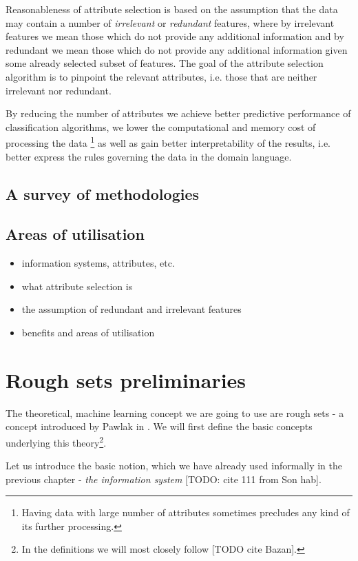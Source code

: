 \documentclass[12pt]{pracamgr}
\begin{document}
Reasonableness of attribute selection is based on the assumption that the data may contain a 
number of \emph{irrelevant} or \emph{redundant} features, where by irrelevant features we 
mean those which do not provide any additional information and by redundant we mean those 
which do not provide any additional information given some already selected subset of 
features. The goal of the attribute selection algorithm is to pinpoint the relevant 
attributes, i.e. those that are neither irrelevant nor redundant.

By reducing the number of attributes we achieve better predictive performance of 
classification algorithms, we lower the computational and memory cost of processing the data
\footnote{Having data with large number of attributes sometimes precludes any kind of its 
further processing.} as well as gain better interpretability of the results, i.e. better 
express the rules governing the data in the domain language.

\section{A survey of methodologies}

\section{Areas of utilisation}


\begin{itemize}
  \item information systems, attributes, etc.
  \item what attribute selection is
  \item the assumption of redundant and irrelevant features
  \item benefits and areas of utilisation
\end{itemize}

\chapter{Rough sets preliminaries}
\label{chap:roughsets}

The theoretical, machine learning concept we are going to use are rough sets - a concept introduced by Pawlak in \cite{pawlak}. We will first define the basic concepts underlying
this theory\footnote{In the definitions we will most closely follow [TODO cite Bazan].}.

Let us introduce the basic notion, which we have already used informally in the previous chapter - \emph{the information system } [TODO: cite 111 from Son hab].
\end{document}
